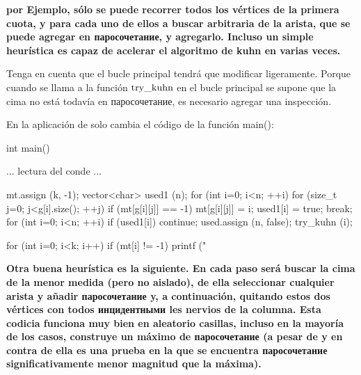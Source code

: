 \bf{por Ejemplo}, sólo se puede recorrer todos los vértices de la primera cuota, y para cada uno de ellos a buscar arbitraria de la arista, que se puede agregar en паросочетание, y agregarlo. Incluso un simple heurística es capaz de acelerar el algoritmo de kuhn en varias veces.

Tenga en cuenta que el bucle principal tendrá que modificar ligeramente. Porque cuando se llama a la función $\rm try\_kuhn$ en el bucle principal se supone que la cima no está todavía en паросочетание, es necesario agregar una inspección.

En la aplicación de solo cambia el código de la función main():

\code
int main() {
... lectura del conde ...

mt.assign (k, -1);
vector<char> used1 (n);
for (int i=0; i<n; ++i)
for (size_t j=0; j<g[i].size(); ++j)
if (mt[g[i][j]] == -1) {
mt[g[i][j]] = i;
used1[i] = true;
break;
}
for (int i=0; i<n; ++i) {
if (used1[i]) continue;
used.assign (n, false);
try_kuhn (i);
}

for (int i=0; i<k; i++)
if (mt[i] != -1)
printf ("%
}
\endcode

\bf{Otra buena heurística} es la siguiente. En cada paso será buscar la cima de la menor medida (pero no aislado), de ella seleccionar cualquier arista y añadir паросочетание y, a continuación, quitando estos dos vértices con todos инцидентными les nervios de la columna. Esta codicia funciona muy bien en aleatorio casillas, incluso en la mayoría de los casos, construye un máximo de паросочетание (a pesar de y en contra de ella es una prueba en la que se encuentra паросочетание significativamente menor magnitud que la máxima).
